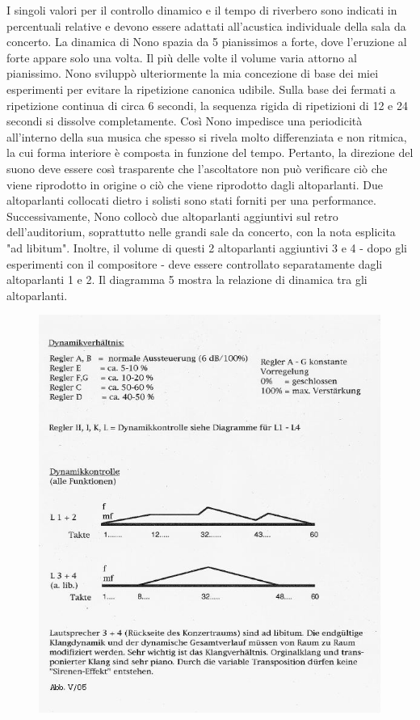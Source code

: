 I singoli valori per il controllo dinamico e il tempo di riverbero sono indicati in percentuali relative e devono essere adattati all'acustica individuale della sala da concerto. La dinamica di Nono spazia da 5 pianissimos a forte, dove l'eruzione al forte appare solo una volta. Il più delle volte il volume varia attorno al pianissimo. Nono sviluppò ulteriormente la mia concezione di base dei miei esperimenti per evitare la ripetizione canonica udibile. Sulla base dei fermati a ripetizione continua di circa 6 secondi, la sequenza rigida di ripetizioni di 12 e 24 secondi si dissolve completamente. Così Nono impedisce una periodicità all'interno della sua musica che spesso si rivela molto differenziata e non ritmica, la cui forma interiore è composta in funzione del tempo. Pertanto, la direzione del suono deve essere così trasparente che l'ascoltatore non può verificare ciò che viene riprodotto in origine o ciò che viene riprodotto dagli altoparlanti. Due altoparlanti collocati dietro i solisti sono stati forniti per una performance. Successivamente, Nono collocò due altoparlanti aggiuntivi sul retro dell'auditorium, soprattutto nelle grandi sale da concerto, con la nota esplicita "ad libitum". Inoltre, il volume di questi 2 altoparlanti aggiuntivi 3 e 4 - dopo gli esperimenti con il compositore - deve essere controllato separatamente dagli altoparlanti 1 e 2. Il diagramma 5 mostra la relazione di dinamica tra gli altoparlanti. 

\begin{figure}[htbp]
\begin{center}
\includegraphics[width=1\textwidth]{images/nono/hph/ab_v_05.jpg}
\caption{}
\label{hph-img5}
\end{center}
\end{figure}


